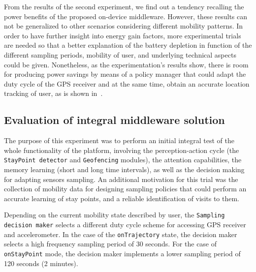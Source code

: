 \documentclass[ENG,PhD]{cinvestav}
\begin{document}
From the results of the second experiment, we find out a tendency recalling the power benefits of the proposed on-device middleware.
However, these results can not be generalized to other scenarios considering different mobility patterns.
In order to have further insight into energy gain factors, more experimental trials are needed so that a better explanation of the battery depletion in function of the different sampling periods, mobility of user, and underlying technical aspects could be given.
Nonetheless, as the experimentation's results show, there is room for producing power savings by means of a policy manager that could adapt the duty cycle of the GPS receiver and at the same time, obtain an accurate location tracking of user, as is shown in~\cite{Paek2010,Lu2010,Chon2014}.

\subsection{Evaluation of integral middleware solution} 
The purpose of this experiment was to perform an initial integral test of the whole functionality of the platform, involving the perception-action cycle (the \texttt{StayPoint detector} and \texttt{Geofencing} modules), the attention capabilities, the memory learning (short and long time intervals), as well as the decision making for adapting sensors sampling.
An additional motivation for this trial was the collection of mobility data for designing sampling policies that could perform an accurate learning of stay points, and a reliable identification of visits to them.

Depending on the current mobility state described by user, the \texttt{Sampling decision maker} selects a different duty cycle scheme for accessing GPS receiver and accelerometer.
In the case of the \texttt{onTrajectory} state, the decision maker selects a high frequency sampling period of 30 seconds.
For the case of \texttt{onStayPoint} mode, the decision maker implements a lower sampling period of 120 seconds (2 minutes).
\end{document}
